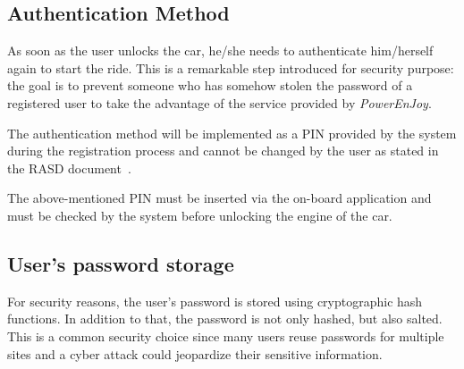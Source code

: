 \subsection{Authentication Method}
As soon as the user unlocks the car, he/she needs to authenticate him/herself again to start the ride. This is a remarkable step introduced for security purpose: the goal is to prevent someone who has somehow stolen the password of a registered user to take the advantage of the service provided by \emph{PowerEnJoy}.

The authentication method will be implemented as a PIN provided by the system during the registration process and cannot be changed by the user as stated in the RASD document~\cite{rasd}.

The above-mentioned PIN must be inserted via the on-board application and must be checked by the system before unlocking the engine of the car.

\subsection{User's password storage}
For security reasons, the user's password is stored using cryptographic hash functions. In addition to that, the password is not only hashed, but also salted. This is a common security choice since many users reuse passwords for multiple sites and a cyber attack could jeopardize their sensitive information. 